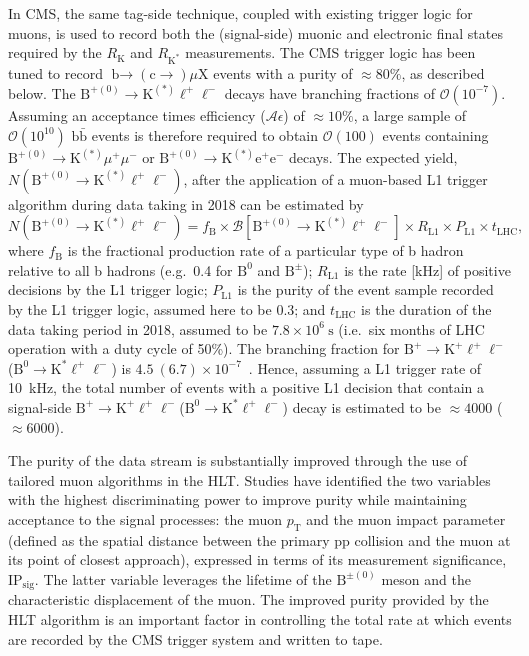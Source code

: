\documentclass{webofc}
\newcommand{\ellell}{\ensuremath{\ell^+\ell^-}\xspace}
\newcommand{\ee}{\ensuremath{\textrm{e}^+\textrm{e}^-}\xspace}
\newcommand{\mumu}{\ensuremath{\mu^+\mu^-}\xspace}
\newcommand{\bto}{\ensuremath{\textrm{b}{\rightarrow}}\xspace}
\newcommand{\btok}{\ensuremath{\textrm{B}^+{\rightarrow}\textrm{K}^+}\xspace}
\newcommand{\btokst}{\ensuremath{\textrm{B}^0{\rightarrow}\textrm{K}^*}\xspace}
\newcommand{\btokstar}{\ensuremath{\textrm{B}^{+(0)}{\rightarrow}\textrm{K}^{(*)}}\xspace}
\newcommand{\btokll}{\ensuremath{\btok\ellell}\xspace}
\newcommand{\rk}{\ensuremath{R_{\textrm{K}}}\xspace}
\newcommand{\btokstll}{\ensuremath{\btokst\ellell}\xspace}
\newcommand{\rkst}{\ensuremath{R_{\textrm{K}^*}}\xspace}
\newcommand{\btokstarll}{\ensuremath{\btokstar\ellell}\xspace}
\newcommand{\btokstarmm}{\ensuremath{\btokstar\mumu}\xspace}
\newcommand{\btokstaree}{\ensuremath{\btokstar\ee}\xspace}
\newcommand{\btoctomux}{\ensuremath{{\bto}(\textrm{c}{\rightarrow})\mu\textrm{X}}\xspace}
\newcommand{\bbar}{\ensuremath{\textrm{b}\bar{\textrm{b}}}\xspace}
\newcommand{\pt}{\ensuremath{p_\textrm{T}}\xspace}
\newcommand{\ate}{\ensuremath{\mathcal{A}\epsilon}\xspace}
\newcommand{\ipsig}{\ensuremath{\textrm{IP}_{\textrm{sig}}}\xspace}
\begin{document}
In CMS, the same tag-side technique, coupled with existing trigger
logic for muons, is used to record both the (signal-side) muonic and
electronic final states required by the \rk and \rkst measurements.
The CMS trigger logic has been tuned to record \btoctomux events with
a purity of ${\approx}80\%$, as described below. The \btokstarll
decays have branching fractions of $\mathcal{O}(10^{-7})$. Assuming an
acceptance times efficiency (\ate) of ${\approx}10\%$, a large sample
of $\mathcal{O}(10^{10})$ \bbar events is therefore required to obtain
$\mathcal{O}(100)$ events containing \btokstarmm or \btokstaree
decays. The expected yield, $N(\btokstarll)$, after the application of
a muon-based L1 trigger algorithm during data taking in 2018 can be
estimated by %
\begin{equation}
  N(\btokstarll) = f_{\textrm{B}} \times
  \mathcal{B}[\btokstarll] \times R_{\textrm{L1}} \times
  P_{\textrm{L1}} \times t_{\textrm{LHC}},
  \label{equ:2}  
\end{equation}
where $f_{\textrm{B}}$ is the fractional production rate of a
particular type of b hadron relative to all b hadrons (e.g.~0.4 for
$\textrm{B}^0$ and $\textrm{B}^\pm$); $R_{\textrm{L1}}$ is the rate
[kHz] of positive decisions by the L1 trigger logic; $P_{\textrm{L1}}$
is the purity of the event sample recorded by the L1 trigger logic,
assumed here to be 0.3; and $t_{\textrm{LHC}}$ is the duration of the
data taking period in 2018, assumed to be $7.8 \times 10^6~\textrm{s}$
(i.e.~six months of LHC operation with a duty cycle of 50\%). The
branching fraction for \btokll (\btokstll) is $4.5~(6.7) \times
10^{-7}$~\cite{pdg}. Hence, assuming a L1 trigger rate of 10~kHz, the
total number of events with a positive L1 decision that contain a
signal-side \btokll (\btokstll) decay is estimated to be
${\approx}4000$ (${\approx}6000$).

The purity of the data stream is substantially improved through the
use of tailored muon algorithms in the HLT. Studies have identified
the two variables with the highest discriminating power to improve
purity while maintaining acceptance to the signal processes: the muon
\pt and the muon impact parameter (defined as the spatial distance
between the primary pp collision and the muon at its point of closest
approach), expressed in terms of its measurement significance, \ipsig.
The latter variable leverages the lifetime of the
$\textrm{B}^{\pm(0)}$ meson and the characteristic displacement of the
muon. The improved purity provided by the HLT algorithm is an
important factor in controlling the total rate at which events are
recorded by the CMS trigger system and written to tape.
\end{document}
